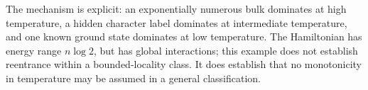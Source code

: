 The mechanism is explicit: an exponentially numerous bulk dominates
at high temperature, a hidden character label dominates at intermediate
temperature, and one known ground state dominates at low temperature.
The Hamiltonian has energy range $n\log2$, but has global interactions;
this example does not establish reentrance within a bounded-locality
class. It does establish that no monotonicity in temperature may be
assumed in a general classification.
